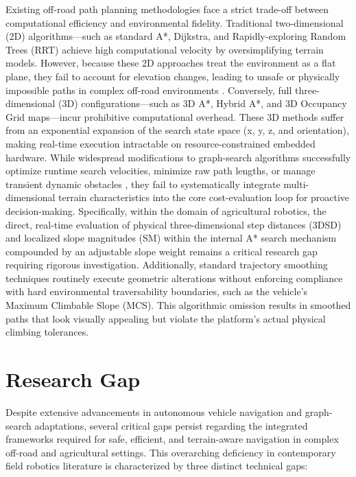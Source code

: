 Existing off-road path planning methodologies face a strict trade-off between
computational efficiency and environmental fidelity. Traditional two-dimensional
(2D) algorithms—such as standard A*, Dijkstra, and Rapidly-exploring Random
Trees (RRT) achieve high computational velocity by oversimplifying terrain
models. However, because these 2D approaches treat the environment as a flat
plane, they fail to account for elevation changes, leading to unsafe or
physically impossible paths in complex off-road environments
\citep{Overbye_2022_localoffroad}. Conversely, full three-dimensional (3D)
configurations—such as 3D A*, Hybrid A*, and 3D Occupancy Grid maps—incur
prohibitive computational overhead. These 3D methods suffer from an exponential
expansion of the search state space (x, y, z, and orientation), making real-time
execution intractable on resource-constrained embedded hardware. While
widespread modifications to graph-search algorithms successfully optimize
runtime search velocities, minimize raw path lengths, or manage transient
dynamic obstacles \citep{Injarapu_2023_surveyautonomous, Lei_2021_globalpath,
Li_2020_pathplanning}, they fail to systematically integrate multi-dimensional
terrain characteristics into the core cost-evaluation loop for proactive
decision-making. Specifically, within the domain of agricultural robotics, the
direct, real-time evaluation of physical three-dimensional step distances (3DSD)
and localized slope magnitudes (SM) within the internal A* search mechanism
compounded by an adjustable slope weight remains a critical research gap
requiring rigorous investigation. Additionally, standard trajectory smoothing
techniques routinely execute geometric alterations without enforcing compliance
with hard environmental traversability boundaries, such as the vehicle's Maximum
Climbable Slope (MCS). This algorithmic omission results in smoothed paths that
look visually appealing but violate the platform's actual physical climbing
tolerances.

\section{Research Gap}

Despite extensive advancements in autonomous vehicle navigation and graph-search
adaptations, several critical gaps persist regarding the integrated frameworks
required for safe, efficient, and terrain-aware navigation in complex off-road
and agricultural settings. This overarching deficiency in contemporary field
robotics literature is characterized by three distinct technical gaps:

